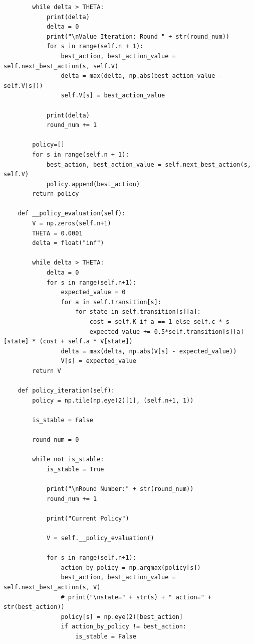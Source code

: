 \documentclass{assignment}
\begin{document}
\begin{problemlist}
\begin{problem}
\begin{answer}
\begin{lstlisting}
        while delta > THETA:
            print(delta)
            delta = 0
            print("\nValue Iteration: Round " + str(round_num))
            for s in range(self.n + 1):
                best_action, best_action_value = self.next_best_action(s, self.V)
                delta = max(delta, np.abs(best_action_value - self.V[s]))
                self.V[s] = best_action_value

            print(delta)
            round_num += 1

        policy=[]
        for s in range(self.n + 1):
            best_action, best_action_value = self.next_best_action(s, self.V)
            policy.append(best_action)
        return policy

    def __policy_evaluation(self):
        V = np.zeros(self.n+1)
        THETA = 0.0001
        delta = float("inf")

        while delta > THETA:
            delta = 0
            for s in range(self.n+1):
                expected_value = 0
                for a in self.transition[s]:
                    for state in self.transition[s][a]:
                        cost = self.K if a == 1 else self.c * s
                        expected_value += 0.5*self.transition[s][a][state] * (cost + self.a * V[state])
                delta = max(delta, np.abs(V[s] - expected_value))
                V[s] = expected_value
        return V

    def policy_iteration(self):
        policy = np.tile(np.eye(2)[1], (self.n+1, 1))

        is_stable = False

        round_num = 0

        while not is_stable:
            is_stable = True

            print("\nRound Number:" + str(round_num))
            round_num += 1

            print("Current Policy")

            V = self.__policy_evaluation()

            for s in range(self.n+1):
                action_by_policy = np.argmax(policy[s])
                best_action, best_action_value = self.next_best_action(s, V)
                # print("\nstate=" + str(s) + " action=" + str(best_action))
                policy[s] = np.eye(2)[best_action]
                if action_by_policy != best_action:
                    is_stable = False


\end{lstlisting}
\end{answer}
\end{problem}
\end{problemlist}
\end{document}

